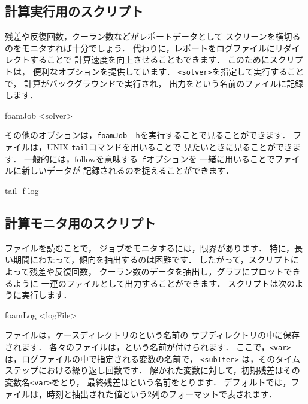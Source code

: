 \subsection{計算実行用のスクリプト}
\label{ssec:6.6.1}
%
%
残差や反復回数，クーラン数などがレポートデータとして
スクリーンを横切るのをモニタすれば十分でしょう．
代わりに，レポートをログファイルにリダイレクトすることで
計算速度を向上させることもできます．
このためにスクリプトは，
便利なオプションを提供しています．
\verb|<solver>|を指定して実行することで，
計算がバックグラウンドで実行され，
出力をという名前のファイルに記録します．
\begin{OFverbatim}[terminal]
foamJob <solver>
\end{OFverbatim}
その他のオプションは，\verb|foamJob -h|を実行することで見ることができます．
ファイルは，UNIX \texttt{tail}コマンドを用いることで
見たいときに見ることができます．
一般的には，followを意味する\verb|-f|オプションを
一緒に用いることでファイルに新しいデータが
記録されるのを捉えることができます．
\begin{OFverbatim}[terminal]
tail -f log
\end{OFverbatim}


\subsection{計算モニタ用のスクリプト}
\label{ssec:6.6.2}
%
%
ファイルを読むことで，
ジョブをモニタするには，限界があります．
特に，長い期間にわたって，傾向を抽出するのは困難です．
したがって，スクリプトによって残差や反復回数，
クーラン数のデータを抽出し，グラフにプロットできるように
一連のファイルとして出力することができます．
スクリプトは次のように実行します．
\begin{OFverbatim}[terminal]
foamLog <logFile>
\end{OFverbatim}
ファイルは，ケースディレクトリのという名前の
サブディレクトリの中に保存されます．
各々のファイルは，という名前が付けられます．
ここで，\texttt{<var>} は，ログファイルの中で指定される変数の名前で，
\texttt{<subIter>} は，そのタイムステップにおける繰り返し回数です．
解かれた変数に対して，初期残差はその変数名\texttt{<var>}をとり，
最終残差はという名前をとります．
デフォルトでは，ファイルは，時刻と抽出された値という2列のフォーマットで表されます．

